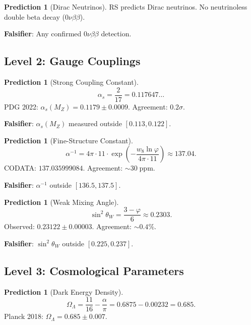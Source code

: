 \documentclass[12pt,a4paper]{article}
\theoremstyle{definition}
\newtheorem{prediction}[theorem]{Prediction}
\theoremstyle{remark}
\begin{document}
\begin{prediction}[Dirac Neutrinos]
RS predicts Dirac neutrinos.  No neutrinoless double beta decay
($0\nu\beta\beta$).
\end{prediction}

\textbf{Falsifier}: Any confirmed $0\nu\beta\beta$ detection.

\subsection{Level 2: Gauge Couplings}

\begin{prediction}[Strong Coupling Constant]
\begin{equation}
  \boxed{\alpha_s = \frac{2}{17} = 0.117647\ldots}
\end{equation}
PDG 2022: $\alpha_s(M_Z) = 0.1179 \pm 0.0009$.  Agreement:
$0.2\sigma$.
\end{prediction}

\textbf{Falsifier}: $\alpha_s(M_Z)$ measured outside $[0.113, 0.122]$.

\begin{prediction}[Fine-Structure Constant]
\begin{equation}
  \alpha^{-1} = 4\pi \cdot 11 \cdot
  \exp\!\left(-\frac{w_8\ln\varphi}{4\pi \cdot 11}\right)
  \approx 137.04.
\end{equation}
CODATA: $137.035999084$.  Agreement: $\sim 30\;\mathrm{ppm}$.
\end{prediction}

\textbf{Falsifier}: $\alpha^{-1}$ outside $[136.5, 137.5]$.

\begin{prediction}[Weak Mixing Angle]
\begin{equation}
  \sin^2\theta_W = \frac{3 - \varphi}{6} \approx 0.2303.
\end{equation}
Observed: $0.23122 \pm 0.00003$.  Agreement: $\sim 0.4\%$.
\end{prediction}

\textbf{Falsifier}: $\sin^2\theta_W$ outside $[0.225, 0.237]$.

\subsection{Level 3: Cosmological Parameters}

\begin{prediction}[Dark Energy Density]
\begin{equation}
  \Omega_\Lambda = \frac{11}{16} - \frac{\alpha}{\pi} = 0.6875 -
  0.00232 = 0.685.
\end{equation}
Planck 2018: $\Omega_\Lambda = 0.685 \pm 0.007$.
\end{prediction}
\end{document}
